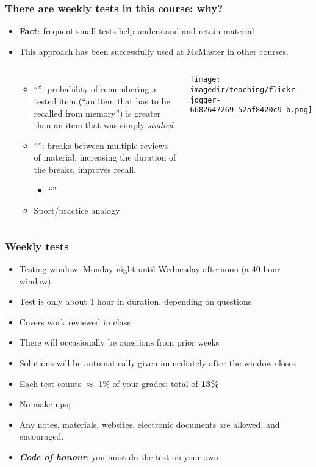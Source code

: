 \begin{frame}\frametitle{There are weekly tests in this course: why?}
	\begin{itemize}
		\item	\textbf{Fact}: frequent small tests help understand and retain material
		\item	This approach has been successfully used at McMaster in other courses.
		\begin{columns}[t]
			\begin{itemize}
				\item	``\emph{{\color{purple}{Testing effect}}}'': probability of remembering a tested item (``an item that has to be recalled from memory'') is greater than an item that was simply \emph{studied}. 
				\vspace{12pt}
				\item	``{\color{purple}{Spacing effect}}'': breaks between multiple reviews of material, increasing the duration of the breaks, improves recall.
				\begin{itemize}
					\item	``{}''
				\end{itemize}
				\vspace{12pt}
				\item	Sport/practice analogy
			\end{itemize}
				\vspace{-1cm}
				\begin{center}
					\texttt{[image: \\imagedir/teaching/flickr-jogger-6682647269\_52af8420c9\_b.png]}
				\end{center}
		\end{columns}
	\end{itemize}
\end{frame}

\begin{frame}\frametitle{Weekly tests}
	\begin{itemize}
		\item	Testing window: Monday night until Wednesday afternoon (a 40-hour window)
		\item	Test is only about 1 hour in duration, depending on questions
		\item	Covers work reviewed in class
		\item	There will occasionally be questions from prior weeks
		\item	Solutions will be automatically given immediately after the window closes
		\item	Each test counts $\approx$ 1\% of your grades; total of {\color{myBlue}\textbf{13\%}}
		\item	No make-ups; {}
		\item	Any notes, materials, websites, electronic documents are allowed, and encouraged.
		\item	\textbf{\emph{Code of honour}}: you must do the test on your own
	\end{itemize}
\end{frame}

